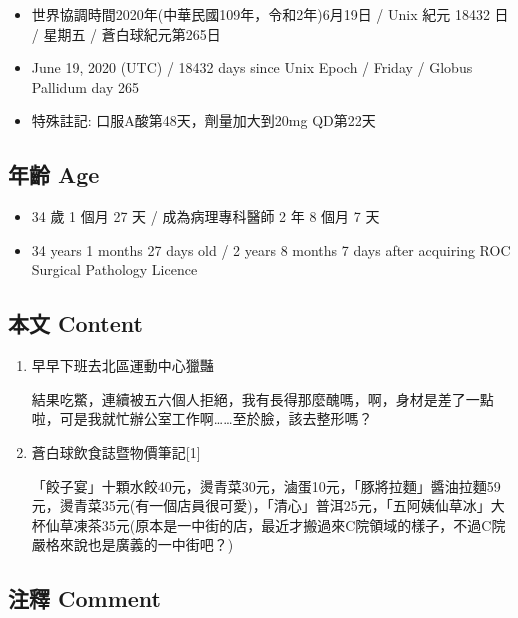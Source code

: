 \documentclass[a5paper, 11pt
]{book}
\providecommand{\tightlist}{%
  \setlength{\itemsep}{0pt}\setlength{\parskip}{0pt}}
\begin{document}
\begin{itemize}
\tightlist
\item
  世界協調時間2020年(中華民國109年，令和2年)6月19日 / Unix 紀元 18432 日
  / 星期五 / 蒼白球紀元第265日
\item
  June 19, 2020 (UTC) / 18432 days since Unix Epoch / Friday / Globus
  Pallidum day 265
\item
  特殊註記: 口服A酸第48天，劑量加大到20mg QD第22天
\end{itemize}

\hypertarget{ux5e74ux9f61-age-16}{%
\subsection{年齡 Age}\label{ux5e74ux9f61-age-16}}

\begin{itemize}
\tightlist
\item
  34 歲 1 個月 27 天 / 成為病理專科醫師 2 年 8 個月 7 天
\item
  34 years 1 months 27 days old / 2 years 8 months 7 days after
  acquiring ROC Surgical Pathology Licence
\end{itemize}

\hypertarget{ux672cux6587-content-16}{%
\subsection{本文 Content}\label{ux672cux6587-content-16}}

\begin{enumerate}
\def\labelenumi{\arabic{enumi}.}
\item
  早早下班去北區運動中心獵豔

  結果吃鱉，連續被五六個人拒絕，我有長得那麼醜嗎，啊，身材是差了一點啦，可是我就忙辦公室工作啊\ldots\ldots 至於臉，該去整形嗎？
\item
  蒼白球飲食誌暨物價筆記{[}1{]}

  「餃子宴」十顆水餃40元，燙青菜30元，滷蛋10元，「豚將拉麵」醬油拉麵59元，燙青菜35元(有一個店員很可愛)，「清心」普洱25元，「五阿姨仙草冰」大杯仙草凍茶35元(原本是一中街的店，最近才搬過來C院領域的樣子，不過C院嚴格來說也是廣義的一中街吧？)
\end{enumerate}

\hypertarget{ux6ce8ux91cb-comment-16}{%
\subsection{注釋 Comment}\label{ux6ce8ux91cb-comment-16}}
\end{document}
